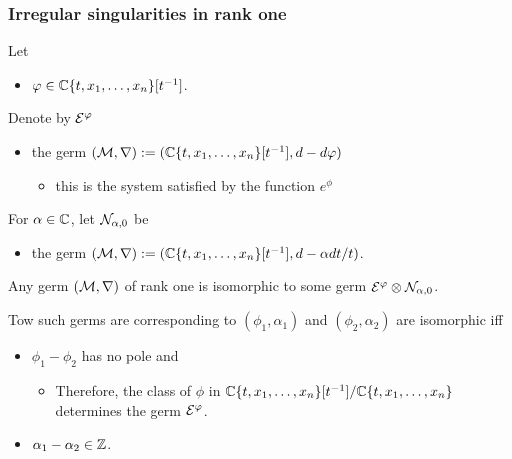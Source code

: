 \subsubsection{Irregular singularities in rank one}
Let
\begin{itemize}
  \item $\varphi\in\mathbb{C}\{t,x_1,\dots,x_n\}[t^{-1}]$.
\end{itemize}
Denote by $\mathcal{E}^{\varphi}$
\begin{itemize}
  \item the germ $(\mathcal{M},\nabla):=(\mathbb{C}\{t,x_1,\dots,x_n\}[t^{-1}],d-d\varphi)$
    \begin{itemize}
      \item this is the system satisfied by the function $e^\phi$
    \end{itemize}
\end{itemize}
For $\alpha\in\mathbb{C}$, let $\mathcal{N}_{\alpha,0}$ be
\begin{itemize}
  \item the germ
    $(\mathcal{M},\nabla):=(\mathbb{C}\{t,x_1,\dots,x_n\}[t^{-1}],d-\alpha dt/t)$.
\end{itemize}
\begin{prop}
  Any germ $(\mathcal{M},\nabla)$ of rank one is isomorphic to some germ
  $\mathcal{E}^{\varphi}\otimes\mathcal{N}_{\alpha,0}$.

  Tow such germs are corresponding to $(\phi_1,\alpha_1)$ and
  $(\phi_2,\alpha_2)$ are isomorphic iff
  \begin{itemize}
    \item $\phi_1-\phi_2$ has no pole and
      \begin{itemize}
        \item Therefore, the class of $\phi$ in
          $\mathbb{C}\{t,x_1,\dots,x_n\}[t^{-1}]/\mathbb{C}\{t,x_1,\dots,x_n\}$ determines the
          germ $\mathcal{E}^\varphi$.
      \end{itemize}
    \item $\alpha_1-\alpha_2\in\mathbb{Z}$.
  \end{itemize}
\end{prop}
